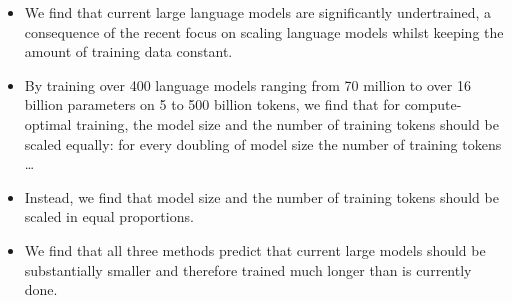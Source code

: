 \begin{itemize}
\item We find that current large language models are significantly undertrained, a consequence of the recent focus on scaling language models whilst keeping the amount of training data constant.
\item By training over 400 language models ranging from 70 million to over 16 billion parameters on 5 to 500 billion tokens, we find that for compute-optimal training, the model size and the number of training tokens should be scaled equally: for every doubling of model size the number of training tokens …
\item Instead, we find that model size and the number of training tokens should be scaled in equal proportions.
\item We find that all three methods predict that current large models should be substantially smaller and therefore trained much longer than is currently done.
\end{itemize}
